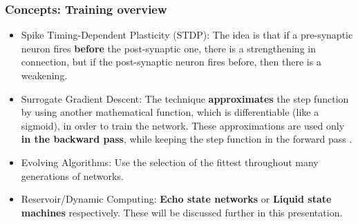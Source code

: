 \begin{frame}
	\frametitle{Concepts: Training overview}
	\begin{itemize}
		\item Spike Timing-Dependent Plasticity (STDP): The idea is that if a pre-synaptic neuron fires \textbf{before} the post-synaptic one, there is a strengthening in connection, but if the post-synaptic neuron fires before, then there is a weakening.
		\item Surrogate Gradient Descent: The technique \textbf{approximates} the step function by using another mathematical function, which is differentiable (like a sigmoid), in order to train the network. These approximations are used only \textbf{in the backward pass}, while keeping the step function in the forward pass \cite{kasabov2019time}.
		\item Evolving Algorithms: Use the selection of the fittest throughout many generations of networks.
		\item Reservoir/Dynamic Computing: \textbf{Echo state networks} or \textbf{Liquid state machines} respectively. These will be discussed further in this presentation.
	\end{itemize}
\end{frame}

